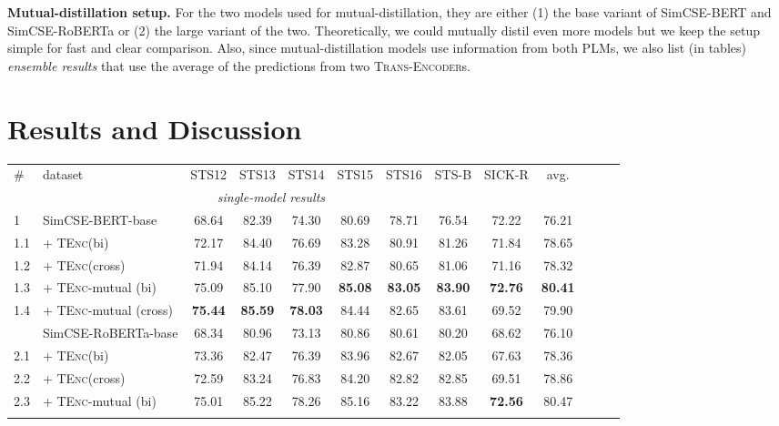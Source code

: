 \documentclass{article} \usepackage{iclr2021_conference,times}
\newcommand{\modelnames}{\textsc{Trans-Encoder}s\xspace}
\newcommand{\tenc}{\textsc{TEnc}\xspace}
\begin{document}
\textbf{Mutual-distillation setup.} 
For the two models used for mutual-distillation, they are either (1) the base variant of SimCSE-BERT and SimCSE-RoBERTa or (2) the large variant of the two. 
Theoretically, we could mutually distil even more models but we keep the setup simple for fast and clear comparison. 
Also, since mutual-distillation models use information from both PLMs, we also list (in tables) \textit{ensemble results} that use the average of the predictions from two \modelnames.




\section{Results and Discussion}


\begin{table}[!t] \setlength{\tabcolsep}{2.0pt}
\centering
\small
\begin{tabular}{llccccccccccc}
\cmidrule[1.5pt]{1-10}
\# & dataset  & STS12 & STS13 & STS14 & STS15 & STS16 & STS-B & SICK-R & avg.\\
\cmidrule[1.5pt]{1-10}
\multicolumn{9}{c}{\textit{single-model results}} \\
\cmidrule[1.0pt]{1-10}
1 & SimCSE-BERT-base & 68.64 & 82.39 & 74.30 & 80.69 & 78.71 & 76.54 & 72.22 & 76.21 \\
1.1 & + \tenc (bi) & 72.17 & 84.40 & 76.69 & 83.28 & 80.91 & 81.26 & 71.84 & 78.65 \\
1.2 & + \tenc (cross) & 71.94 & 84.14 & 76.39 & 82.87 & 80.65 & 81.06 & 71.16 & 78.32\\
\rowcolor{blue!5}
1.3 & + \tenc-mutual (bi) & 75.09 & 85.10 & 77.90 & \textbf{85.08} & \textbf{83.05} & \textbf{83.90} & \textbf{72.76} & \textbf{80.41} \\
\rowcolor{blue!5}
1.4 & + \tenc-mutual (cross) & \textbf{75.44} & \textbf{85.59} & \textbf{78.03} & 84.44 & 82.65 & 83.61 & 69.52 & 79.90 \\
\hdashline
2 & SimCSE-RoBERTa-base & 68.34 & 80.96 & 73.13 & 80.86 & 80.61 & 80.20 & 68.62 & 76.10 \\
2.1 & + \tenc (bi) &   73.36 & 82.47 & 76.39 & 83.96 & 82.67  & 82.05 & 67.63 & 78.36 \\
2.2 & + \tenc (cross) & 72.59 & 83.24 & 76.83 & 84.20 & 82.82 & 82.85 & 69.51 & 78.86 \\
\rowcolor{blue!5}
2.3 & + \tenc-mutual (bi) & 75.01 & 85.22 & 78.26 & 85.16 & 83.22 & 83.88 & \textbf{72.56} & 80.47 \\
\rowcolor{blue!5}

\end{tabular}
\end{table}
\end{document}
